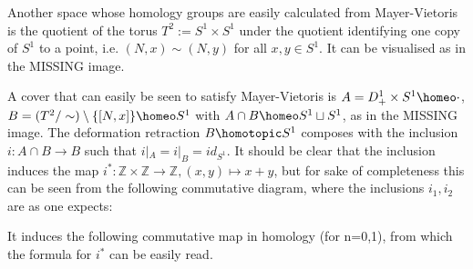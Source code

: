 \begin{example}
Another space whose homology groups are easily calculated from Mayer-Vietoris is the quotient of the torus $T^2:= S^1 \times S^1$ under the quotient identifying one copy of $S^1$ to a point, i.e. $(N,x)\sim (N,y)$ for all $x,y \in S^1$. It can be visualised as in the MISSING image.

A cover that can easily be seen to satisfy Mayer-Vietoris is $A=D^1_+ \times S^1 \homeo \cdot$, $B=(T^2/\sim) \setminus\{[N,x]\}\homeo S^1$ with $A\cap B \homeo S^1\sqcup S^1$, as in the MISSING image. The deformation retraction $B\homotopic S^1$ composes with the inclusion $i:A\cap B\rightarrow B$ such that $i|_A=i|_B =id_{S^1}$. It should be clear that the inclusion induces the map $i^*:\mathbb{Z}\times \mathbb{Z}\rightarrow \mathbb{Z}, (x,y)\mapsto x+y$, but for sake of completeness this can be seen from the following commutative diagram, where the inclusions $i_1,i_2$ are as one expects:


It induces the following commutative map in homology (for n=0,1), from which the formula for $i^*$ can be easily read. 



\end{example}
